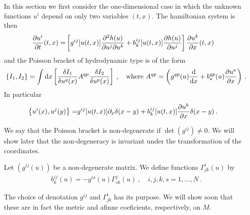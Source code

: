 In this section we first consider the one-dimensional case in which the unknown functions $u^i$ depend on only two variables $(t,x)$. The hamiltonian system is then
\begin{align}
    \frac{\partial u^i}{\partial t} (t,x) =&
    \left[ g^{ij} [u(t,x)] \frac{\partial^2 h(u)}{\partial u^j \partial u^k} + b_k^{ij} [u(t,x)] \frac{\partial h(u)}{\partial u^j} \right] \frac{\partial u^k}{\partial x}(t,x) 
\end{align}
and the Poisson bracket of hydrodynamic type is of the form
\begin{align}
    \left \lbrace I_1,I_2 \right \rbrace = \int \mathrm{d} x
    \left[ \frac{\delta I_1}{\delta u^q(x)} A^{qp} \frac{\delta I_2}{\delta u^p(x)} \right] \:,\quad \text{where } A^{qp} = \left( g^{qp}(u) \frac{\mathrm{d}}{\mathrm{d}x} + b^{qp}_s(u) \frac{\partial u^s}{\partial x} \right) \:.
\end{align}
In particular
\begin{align}
    \label{eq:Poisson1D}
    \left \lbrace u^i(x), u^j(y) \right \rbrace =& g^{ij} [u(t,x)] \partial_x \delta(x-y) + b_k^{ij} [u(t,x)] \frac{\partial u^k}{\partial x} \delta(x-y) \:. 
\end{align}

We say that the Poisson bracket is non-degenerate if $\det(g^{ij}) \neq 0$. We will show later that the non-degeneracy is invariant under the transformation of the coordinates.

\begin{definition}
    Let $(g^{ij}(u))$ be a non-degenerate matrix. We define functions $\Gamma^{i}_{jk}(u)$ by
        \begin{align}
            b_k^{ij}(u) = -g^{is}(u) \Gamma^j_{sk}(u) \:, \quad i,j,k,s=1,\dots,N \:. \label{eq:definice-Gamma}
        \end{align}
\end{definition}

The choice of denotation $g^{ij}$ and $\Gamma^{i}_{jk}$ has its purpose. We will show soon that these are in fact the metric and afinne coeficients, respectively, on $M$.

